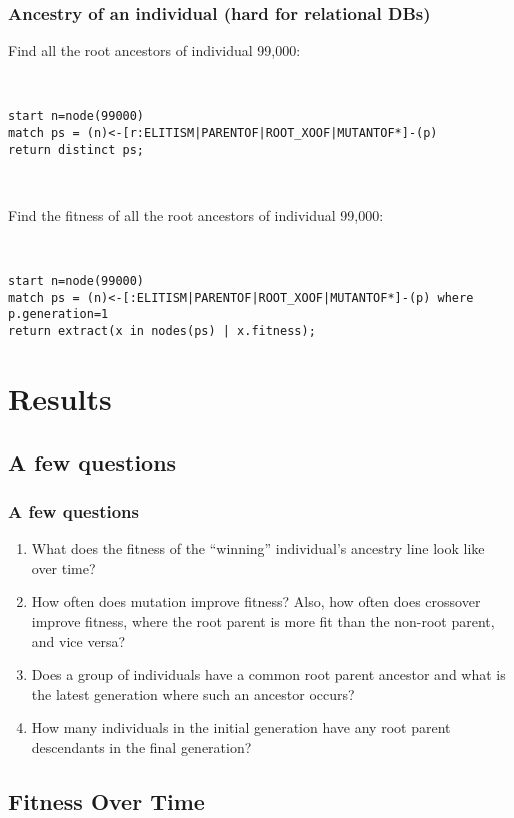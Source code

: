 \documentclass{beamer}
\begin{document}
\begin{frame}
\frametitle{Ancestry of an individual (hard for relational DBs)}

Find all the root ancestors of individual 99,000:

~

\texttt{start n=node(99000) \\
match ps = (n)<-[r:ELITISM|PARENTOF|ROOT\_XOOF|MUTANTOF*]-(p) \\
return distinct ps;
}

~

Find the fitness of all the root ancestors of individual 99,000:

~

\texttt{start n=node(99000) \\
match ps = (n)<-[:ELITISM|PARENTOF|ROOT\_XOOF|MUTANTOF*]-(p) where p.generation=1 \\
return extract(x in nodes(ps) | x.fitness);
}

\end{frame}

\section[Results]{Results}

\subsection{A few questions}

\begin{frame}
\frametitle{A few questions}
\begin{enumerate}
\item What does the fitness of the ``winning'' individual's ancestry line look like over time?
\item How often does mutation improve fitness? Also, how often does crossover improve fitness, where the root parent is more fit than the non-root parent, and vice versa?
\item Does a group of individuals have a common root parent ancestor and what is the latest generation where such an ancestor occurs?
\item How many individuals in the initial generation have any root parent descendants in the final generation?
\end{enumerate}
\end{frame}

\subsection[Fitness Graph]{Fitness Over Time}
\end{document}
